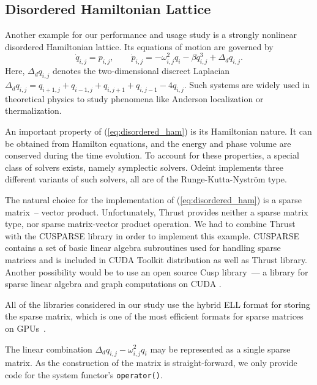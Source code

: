 \documentclass[final]{siamltex}
\newcommand{\code}[1]{\lstinline|#1|}
\newcommand{\eqref}[1]{(\ref{#1})}
\begin{document}
%
%
\subsection{Disordered Hamiltonian Lattice}


Another example for our performance and usage study is a strongly
nonlinear disordered Hamiltonian lattice. Its equations of motion are
governed by
\begin{equation}
\dot{q}_{i,j} = p_{i,j}, \quad \quad 
\dot{p}_{i,j} = - \omega_{i,j}^2 q_i - \beta q_{i,j}^3 + \Delta_d q_{i,j}.
\label{eq:disordered_ham}
\end{equation}
Here, $\Delta_d q_{i,j}$ denotes the two-dimensional discreet Laplacian
$\Delta_d
q_{i,j}=q_{i+1,j}+q_{i-1,j}+q_{i,j+1}+q_{i,j-1}-4q_{i,j}$. Such
systems are widely used in theoretical physics to study phenomena
like Anderson localization or thermalization.

An important property of \eqref{eq:disordered_ham} is its Hamiltonian
nature. It can be obtained from Hamilton equations, and the energy and
phase volume are conserved during the time evolution. To account for
these properties, a special class of solvers exists, namely symplectic
solvers. Odeint implements three different variants of such solvers,
all are of the Runge-Kutta-Nystr\"om type.



The natural choice for the implementation of \eqref{eq:disordered_ham} is a
sparse matrix~-- vector product. Unfortunately, Thrust provides neither a sparse
matrix type, nor sparse matrix-vector product operation.  We had to combine
Thrust with the CUSPARSE library in order to implement this example. CUSPARSE
contains a set of basic linear algebra subroutines used for handling sparse
matrices and is included in CUDA Toolkit distribution as well as Thrust
library. Another possibility would be to use an open source Cusp library~--- a
library for sparse linear algebra and graph computations on CUDA
\cite{CuspRef}.

All of the libraries considered in our study use the hybrid
ELL format for storing the sparse matrix, which is one of the most efficient
formats for sparse matrices on GPUs~\cite{BellGarland2008}.

The linear combination $\Delta_d q_{i,j} - \omega^2_{i,j}q_i$ may be represented
as a single sparse matrix.  As the construction of the matrix is
straight-forward, we only provide code for the system functor's
\code{operator()}.
\end{document}

